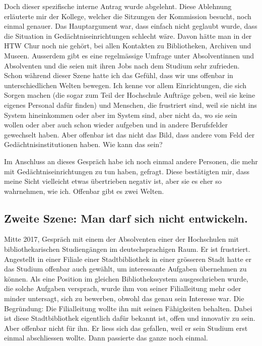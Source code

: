 \documentclass[a4paper,
fontsize=11pt,
oneside,
numbers=noperiodatend,
parskip=half-,
bibliography=totoc,
final
]{scrartcl}
\begin{document}
Doch dieser spezifische interne Antrag wurde abgelehnt. Diese Ablehnung
erläuterte mir der Kollege, welcher die Sitzungen der Kommission
besucht, noch einmal genauer. Das Hauptargument war, dass einfach nicht
geglaubt wurde, dass die Situation in Gedächtniseinrichtungen schlecht
wäre. Davon hätte man in der HTW Chur noch nie gehört, bei allen
Kontakten zu Bibliotheken, Archiven und Museen. Ausserdem gibt es eine
regelmässige Umfrage unter Absolventinnen und Absolventen und die seien
mit ihren Jobs nach dem Studium sehr zufrieden. Schon während dieser
Szene hatte ich das Gefühl, dass wir uns offenbar in unterschiedlichen
Welten bewegen. Ich kenne vor allem Einrichtungen, die sich Sorgen
machen (die sogar zum Teil der Hochschule Aufträge geben, weil sie keine
eigenes Personal dafür finden) und Menschen, die frustriert sind, weil
sie nicht ins System hineinkommen oder aber im System sind, aber nicht
da, wo sie sein wollen oder aber auch schon wieder aufgeben und in
andere Berufsfelder gewechselt haben. Aber offenbar ist das nicht das
Bild, dass andere vom Feld der Gedächtnisinstitutionen haben. Wie kann
das sein?

Im Anschluss an dieses Gespräch habe ich noch einmal andere Personen,
die mehr mit Gedächtniseinrichtungen zu tun haben, gefragt. Diese
bestätigten mir, dass meine Sicht vielleicht etwas übertrieben negativ
ist, aber sie es eher so wahrnehmen, wie ich. Offenbar gibt es zwei
Welten.

\hypertarget{zweite-szene-man-darf-sich-nicht-entwickeln.}{%
\subsection*{Zweite Szene: Man darf sich nicht
entwickeln.}\label{zweite-szene-man-darf-sich-nicht-entwickeln.}}

Mitte 2017, Gespräch mit einem der Absolventen einer der Hochschulen mit
bibliothekarischen Studiengängen im deutschsprachigen Raum. Er ist
frustriert. Angestellt in einer Filiale einer Stadtbibliothek in einer
grösseren Stadt hatte er das Studium offenbar auch gewählt, um
interessante Aufgaben übernehmen zu können. Als eine Position im
gleichen Bibliothekssystem ausgeschrieben wurde, die solche Aufgaben
versprach, wurde ihm von seiner Filialleitung mehr oder minder
untersagt, sich zu bewerben, obwohl das genau sein Interesse war. Die
Begründung: Die Filialleitung wollte ihn mit seinen Fähigkeiten
behalten. Dabei ist diese Stadtbibliothek eigentlich dafür bekannt ist,
offen und innovativ zu sein. Aber offenbar nicht für ihn. Er liess sich
das gefallen, weil er sein Studium erst einmal abschliessen wollte. Dann
passierte das ganze noch einmal.
\end{document}
